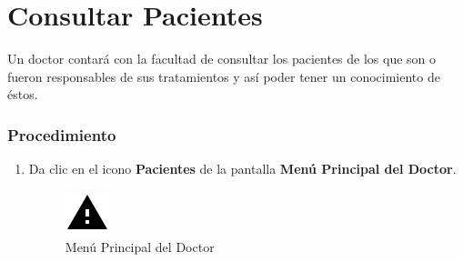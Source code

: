 \section{Consultar Pacientes}

Un doctor contará con la facultad de consultar los pacientes de los que son o fueron responsables de sus tratamientos y así poder tener un conocimiento de éstos.

\subsubsection{Procedimiento}
\begin{enumerate}
	
	\item Da clic en el icono \textbf{Pacientes} de la pantalla \textbf{Menú Principal del Doctor}.

		\begin{figure}[!htbp]			\hypertarget{fig:mpDoctor2}{\hspace{1pt}}
		\begin{center}
			\includegraphics[height=0.4\textheight]{images/Iconos/Advertencia}
			\caption{Menú Principal del Doctor}
			\label{fig:mpDoctor2}
		\end{center}
	\end{figure}


\end{enumerate}
